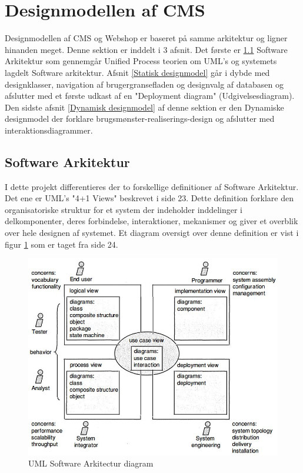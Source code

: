 \section{Designmodellen af CMS}
Designmodellen af CMS og Webshop er baseret på samme arkitektur og ligner hinanden meget. Denne sektion er inddelt i 3 afsnit. Det første er \ref{Software Arkitektur} Software Arkitektur som gennemgår Unified Process teorien om UML's og systemets lagdelt Software arkitektur.
Afsnit \ref{Statisk designmodel} går i dybde med designklasser, navigation af brugergransefladen og designvalg af databasen og afslutter med et første udkast af en "Deployment diagram" (Udgivelsesdiagram).
Den sidste afsnit \ref{Dynamisk designmodel} af denne sektion er den Dynamiske designmodel der forklare brugsmønster-realiserings-design og afslutter med interaktionsdiagrammer.

\subsection{Software Arkitektur} \label{Software Arkitektur}
I dette projekt differentieres der to forskellige definitioner af Software Arkitektur. Det ene er UML's "4+1 Views" beskrevet i \cite{A&N} side 23. Dette definition forklare den organisatoriske struktur for et system der indeholder inddelinger i delkomponenter, deres forbindelse, interaktioner, mekanismer og giver et overblik over hele designen af systemet. Et diagram oversigt over denne definition er vist i figur \ref{UML2-SoftwareArkitektur} som er taget fra \cite{A&N} side 24.

\begin{figure}[ht]
\centering
	\includegraphics[width=15cm]{elaborationsdokumentet/figurer/design/soft-ark/UML2-SoftwareArkitektur.JPG}
    \caption{UML Software Arkitectur diagram}
    \label{UML2-SoftwareArkitektur}
\end{figure}

